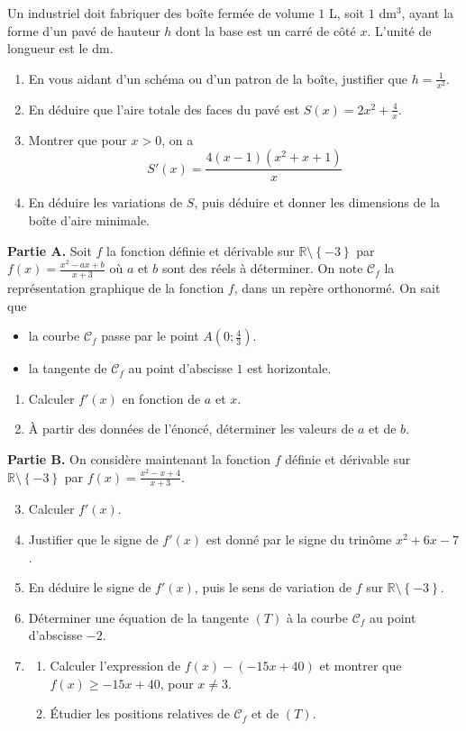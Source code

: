 \documentclass[11pt]{article}
\begin{document}
\begin{exo}
Un industriel doit fabriquer des boîte fermée de volume $1$ L, soit $1$ dm$^3$,
ayant la forme d'un pavé de hauteur $h$ dont la base est un carré de côté $x$.
L'unité de longueur est le dm.
\begin{enumerate}
  \item En vous aidant d'un schéma ou d'un patron de la boîte, justifier que
    $h=\frac{1}{x^2}$.
  \item En déduire que l'aire totale des faces du pavé est
    $S(x)=2x^2+\frac{4}{x}$.
  \item Montrer que pour $x>0$, on a
    \[
      S'(x) = \frac{4(x-1)(x^2+x+1)}{x}
    \]
  \item En déduire les variations de $S$, puis déduire et donner les dimensions
    de la boîte d'aire minimale.
\end{enumerate}
\end{exo}

\begin{exo}
\textbf{Partie A.} Soit $f$ la fonction définie et dérivable sur
$\mathbb{R}\setminus\left\{ -3 \right\}$ par $f(x)=\frac{x^2-ax+b}{x+3}$ où $a$ et
$b$ sont des réels à déterminer. On note $\mathscr C_f$ la représentation
graphique de la fonction $f$, dans un repère orthonormé. On sait que
\begin{itemize}
  \item la courbe $\mathscr C_f$ passe par le point $A\left( 0;
    \frac{4}{3} \right)$.
  \item la tangente de $\mathscr C_f$ au point d'abscisse $1$ est horizontale.
\end{itemize}
\begin{enumerate}
  \item Calculer $f'(x)$ en fonction de $a$ et $x$.
  \item À partir des données de l'énoncé, déterminer les valeurs de $a$ et de
    $b$.
\end{enumerate}
\textbf{Partie B.} On considère maintenant la fonction $f$ définie et dérivable
sur $\mathbb{R}\setminus\left\{ -3 \right\}$ par $f(x)=\frac{x^2-x+4}{x+3}$.
\begin{enumerate}
    \setcounter{enumi}{2}
  \item Calculer $f'(x)$.
  \item Justifier que le signe de $f'(x)$ est donné par le signe du trinôme
    $x^2+6x-7$.
  \item En déduire le signe de $f'(x)$, puis le sens de variation de $f$ sur
    $\mathbb{R}\setminus\left\{ -3 \right\}$.
  \item Déterminer une équation de la tangente $(T)$ à la courbe $\mathscr C_f$
    au point d'abscisse $-2$.
  \item \begin{enumerate}
      \item Calculer l'expression de $f(x)-(-15x+40)$ et montrer que $f(x)\geq
        -15x+40$, pour $x\neq3$.
      \item Étudier les positions relatives de $\mathscr C_f$ et de $(T)$.
    \end{enumerate}
\end{enumerate}
\end{exo}
\end{document}
